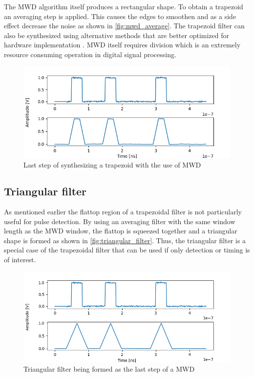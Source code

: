 The MWD algorithm itself produces a rectangular shape. To obtain a trapezoid
an averaging step is applied. This causes the edges to smoothen and as a 
side effect decrease the noise as shown in \autoref{fig:mwd_average}.
The trapezoid filter can also be synthesized using
alternative methods that are better optimized for hardware implementation
\cite{jordanov_trapezoidal}.
MWD itself requires division which is an extremely resource consuming operation 
in digital signal processing.

\begin{figure}[H]
  \centering
  \includegraphics[width=\linewidth]{media/mwd_average.png}
  \caption{Last step of synthesizing a trapezoid with the use of MWD}
  \label{fig:mwd_average} 
\end{figure}

\subsection{Triangular filter}

As mentioned earlier the flattop region of a trapezoidal filter
is not particularly useful for pulse detection. By using an 
averaging filter with the same window length as the MWD window, 
the flattop is squeezed together and a triangular shape is formed
as shown in \autoref{fig:triangular_filter}.
Thus, the triangular filter is a special case of the 
trapezoidal filter that can be used if only detection or timing is of interest.

\begin{figure}[H]
  \centering
  \includegraphics[width=\linewidth]{media/triangular_filter.png}
  \caption{Triangular filter being formed as the last step of a MWD}
  \label{fig:triangular_filter} 
\end{figure}

